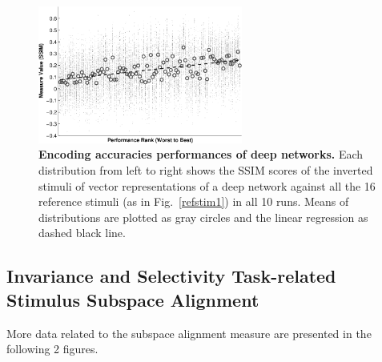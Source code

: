 \documentclass{article} %
\begin{document}
\begin{figure}[H]
\centering \includegraphics[width=0.60\textwidth]{Figs_supp/e_fig6b-crop.pdf}
\caption{
{\bf Encoding accuracies \vs performances of deep networks.} Each distribution from left to right shows the SSIM scores of the inverted stimuli of vector representations of a deep network against all the 16 reference stimuli (as in Fig.~\ref{refstim1}) in all 10 runs. Means of distributions are plotted as gray circles and the linear regression as dashed black line. %
}
\end{figure}

\clearpage

\subsection{Invariance and Selectivity \vs Task-related Stimulus Subspace Alignment}
More data related to the subspace alignment measure are presented in the following 2 figures.
\end{document}
